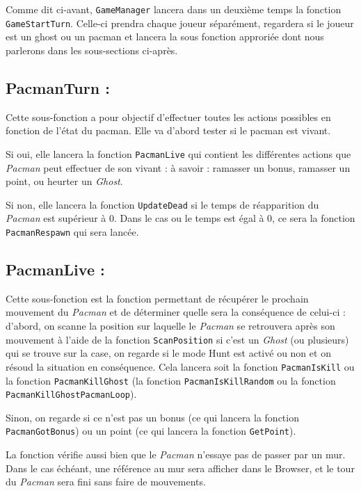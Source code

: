 \documentclass[a4paper, 11pt]{article}
\begin{document}
Comme dit ci-avant, \texttt{GameManager} lancera dans un deuxième temps la fonction \texttt{GameStartTurn}.  Celle-ci prendra chaque joueur séparément, regardera si le joueur est un ghost ou un pacman et lancera la sous fonction approriée dont nous parlerons dans les sous-sections ci-après.

\subsection{PacmanTurn :}
Cette sous-fonction a pour objectif d'effectuer toutes les actions possibles en fonction de l'état du pacman.  Elle va d'abord tester si le pacman est vivant.  

Si oui, elle lancera la fonction \texttt{PacmanLive} qui contient les différentes actions que \textit{Pacman} peut effectuer de son vivant : à savoir : ramasser un bonus, ramasser un point, ou heurter un \textit{Ghost}.

Si non, elle lancera la fonction \texttt{UpdateDead} si le temps de réapparition du \textit{Pacman} est supérieur à 0.  Dans le cas ou le temps est égal à 0, ce sera la fonction \texttt{PacmanRespawn} qui sera lancée.

\subsection{PacmanLive :}

Cette sous-fonction est la fonction permettant de récupérer le prochain mouvement du \textit{Pacman} et de déterminer quelle sera la conséquence de celui-ci : d'abord, on scanne la position sur laquelle le \textit{Pacman} se retrouvera après son mouvement à l'aide de la fonction \texttt{ScanPosition} si c'est un \textit{Ghost} (ou plusieurs) qui se trouve sur la case, on regarde si le mode Hunt est activé ou non et on résoud la situation en conséquence.  Cela lancera soit la fonction \texttt{PacmanIsKill} ou la fonction \texttt{PacmanKillGhost} (la fonction \texttt{PacmanIsKillRandom} ou la fonction \texttt{PacmanKillGhostPacmanLoop}). 

Sinon, on regarde si ce n'est pas un bonus (ce qui lancera la fonction \texttt{PacmanGotBonus}) ou un point (ce qui lancera la fonction \texttt{GetPoint}).

La fonction vérifie aussi bien que le \textit{Pacman} n'essaye pas de passer par un mur.  Dans le cas échéant, une référence au mur sera afficher dans le Browser, et le tour du \textit{Pacman} sera fini sans faire de mouvements.  
\end{document}

